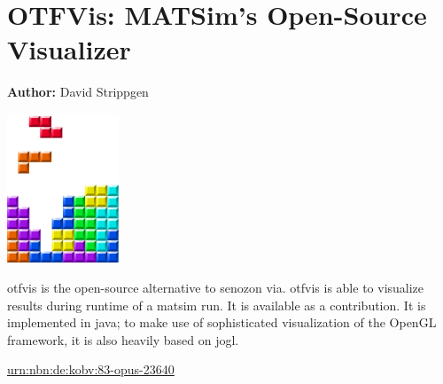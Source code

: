 \chapter{OTFVis: MATSim's Open-Source Visualizer}
\label{ch:otfvis}

\hfill \textbf{Author:} David Strippgen

\begin{center} \includegraphics[width=0.25\textwidth, angle=0]{frontmatter/figures/MATSimBook} \end{center}


\gls{otfvis} is the open-source alternative to \gls{senozon} \gls{via}. 
\gls{otfvis} is able to visualize results during runtime of a \gls{matsim} run. 
It is available as a \gls{contribution}. 
It is implemented in \gls{java}; to make use of sophisticated visualization of the OpenGL framework, it is also heavily based on jogl. 


\url{urn:nbn:de:kobv:83-opus-23640}





